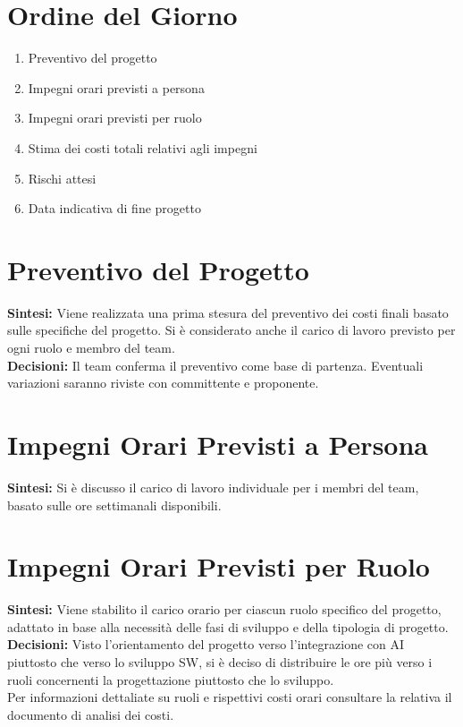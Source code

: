 \documentclass{article}
\begin{document}
\newpage
\section*{Ordine del Giorno}
\begin{enumerate}
    \item Preventivo del progetto
    \item Impegni orari previsti a persona
    \item Impegni orari previsti per ruolo
    \item Stima dei costi totali relativi agli impegni
    \item Rischi attesi
    \item Data indicativa di fine progetto
\end{enumerate}

\section{Preventivo del Progetto}
\textbf{Sintesi:} Viene realizzata una prima stesura del preventivo dei costi finali basato sulle specifiche del progetto. Si è considerato anche il carico di lavoro previsto per ogni ruolo e membro del team. \\
\textbf{Decisioni:} Il team conferma il preventivo come base di partenza. Eventuali variazioni saranno riviste con committente e proponente.

\section{Impegni Orari Previsti a Persona}
\textbf{Sintesi:} Si è discusso il carico di lavoro individuale per i membri del team, basato sulle ore settimanali disponibili.

\section{Impegni Orari Previsti per Ruolo}
\textbf{Sintesi:} Viene stabilito il carico orario per ciascun ruolo specifico del progetto, adattato in base alla necessità delle fasi di sviluppo e della tipologia di progetto. \\
\textbf{Decisioni:} Visto l'orientamento del progetto verso l'integrazione con AI piuttosto che verso lo sviluppo SW, si è deciso di distribuire le ore più verso i ruoli concernenti la progettazione piuttosto che lo sviluppo.\\Per informazioni dettaliate su ruoli e rispettivi costi orari consultare la relativa il documento di analisi dei costi.
\end{document}
